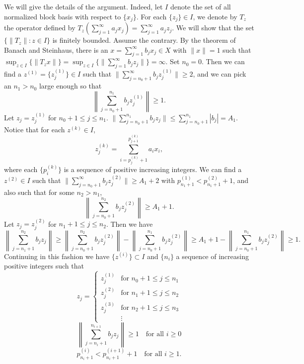 \documentclass[12pt]{report}
\begin{document}
We will give the details of the argument.
Indeed, let $I$ denote the set of all normalized block basis with respect to $\{x_j\}$.
For each $\{z_j\} \in I$,
we denote by $T_z$ the operator defined by $T_z(\sum_{j=1}^\infty a_j x_j) = \sum_{j=1}^\infty a_j z_j$.
We will show that the set $\{\|T_z\| : z\in I\}$ is finitely bounded.
Assume the contrary.  By the theorem of
Banach and Steinhaus, there is an $x = \sum_{j=1}^\infty b_j x_j \in X$ with $\|x\| = 1$ such that
$\sup_{z\in I} \{\|T_z x\|\} = \sup_{z\in I} \{\|\sum_{j=1}^\infty b_j z_j\|\} = \infty$.
Set $n_0 = 0$.
Then we can find a $z^{(1)} = \{z^{(1)}_j\} \in I$ such that
$\|\sum_{j=n_0 + 1}^\infty b_j z^{(1)}_j\| \geq 2$, 
and we can pick an $n_1 > n_0$ large enough so that
$$
\left\|\sum_{j=n_0 +1}^{n_1} b_j z^{(1)}_j \right\| \geq 1.
$$
Let $z_j = z^{(1)}_j$
for $n_0 +1\leq j\leq n_1$.  $\|\sum_{j=n_0 +1}^{n_1} b_j z_j \| \leq
\sum_{j=n_0 +1}^{n_1} |b_j| = A_1$.
Notice that for each $z^{(k)} \in I$,
$$
z^{(k)}_j = \sum_{i=p_j^{(k)} +1}^{p_{j+1}^{(k)}} a_i x_i,
$$
where each $\{p_i^{(k)}\}$ is a sequence of positive increasing integers.
We can find a $z^{(2)} \in I$ such that $\|\sum_{j=n_0 +1}^\infty b_j z^{(2)}_j\| \geq A_1 + 2$ with
$p^{(1)}_{n_1 +1} < p^{(2)}_{n_1 +1} + 1$,
and also such that for some $n_2 > n_1$,
$$
\left\|\sum_{j=n_0 +1}^{n_2} b_j z_j^{(2)} \right\| \geq A_1 + 1.
$$
Let $z_j = z^{(2)}_j$ for $n_1 + 1 \leq j \leq n_2$.  Then we have
$$
\left\|\sum_{j=n_1 +1}^{n_2} b_j z_j \right\| \geq
\left\|\sum_{j=n_0 +1}^{n_2} b_j z_j^{(2)} \right\|
- \left\|\sum_{j=n_0 +1}^{n_1} b_j z^{(2)}_j \right\| \geq
A_1 + 1 - \left\|\sum_{j=n_0 +1}^{n_1} b_j z^{(2)}_j \right\|\geq 1.
$$
Continuing in this fashion we have $\{z^{(i)}\} \subset I$ and $\{n_i\}$ a sequence of increasing positive integers
such that
\begin{equation*}
z_j = 
\begin{cases} z^{(1)}_j & \text{for $n_0 +1 \leq j\leq n_1$}\\
z^{(2)}_j & \text{for $n_1 +1 \leq j \leq n_2$}\\
z^{(3)}_j & \text{for $n_2 +1 \leq j \leq n_3$}\\
& \vdots
\end{cases}
\end{equation*}
\begin{equation}\label{converge}
\left\|\sum_{j=n_i +1}^{n_{i+1}} b_j z_j \right\| \geq 1\quad \text{for all $i\geq 0$}
\end{equation}
\begin{equation}\label{block}
p_{n_i + 1}^{(i)} < p_{n_i + 1}^{(i+1)} + 1 \quad\text{for all $i\geq 1$.}
\end{equation}
\end{document}
